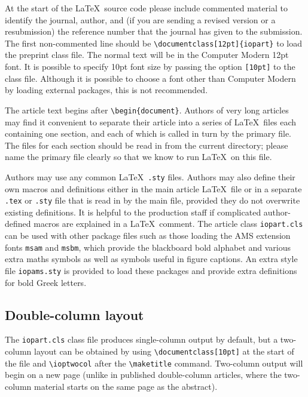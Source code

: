 \documentclass[12pt]{iopart}
\begin{document}
At the start of the \LaTeX\ source code please include 
commented material to identify the journal, author, and (if you are sending a revised
version or a resubmission) the reference number that the journal
has given to the submission. The first non-commented line should be 
\verb"\documentclass[12pt]{iopart}"  to load the preprint class 
file.  The normal text will be in the Computer Modern 12pt font.
It is possible to specify 10pt font size by passing the option \verb"[10pt]" to the class file.
Although it is possible to choose a font other than Computer Modern by loading external packages, this is not recommended.

The article text begins after \verb"\begin{document}".
Authors of very long articles may find it convenient to separate 
their article into a series of \LaTeX\ files each containing one section, and each of which is called 
in turn by the primary file.  The files for each section should be read in from the current directory;
please name the primary file clearly so that we know to run \LaTeX\ on this file.

Authors may use any common \LaTeX\ \verb".sty" files.
Authors may also define their own macros and definitions either in the main article \LaTeX\ file
or in a separate \verb".tex" or \verb".sty" file that is read in by the
main file, provided they do not overwrite existing definitions.
It is helpful to the production staff if complicated author-defined macros are explained in a \LaTeX\ comment.
The article class \verb"iopart.cls" can be used with other package files such
as those loading the AMS extension fonts 
\verb"msam" and \verb"msbm", which provide the 
blackboard bold alphabet and various extra maths symbols as well as symbols useful in figure 
captions.  An extra style file \verb"iopams.sty" is provided to load these
packages and provide extra definitions for bold Greek letters.

\subsection{\label{dblcol}Double-column layout}
The \verb"iopart.cls" class file produces single-column output by default, but a two-column layout can be obtained by
using \verb"\documentclass[10pt]" at the start of the file and \verb"\ioptwocol" after the \verb"\maketitle" command.  Two-column output will begin
on a new page (unlike in published double-column articles, where the two-column material
starts on the same page as the abstract).
\end{document}
